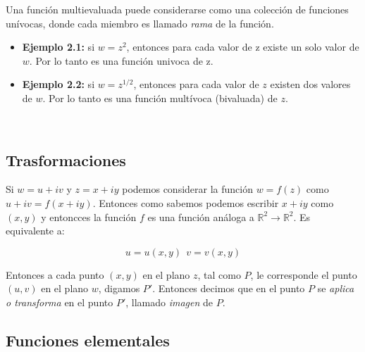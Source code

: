 \documentclass[12pt]{book}
\begin{document}
Una función multievaluada puede considerarse como una colección de funciones unívocas, donde cada miembro es llamado \textit{rama} de la función.  \\



\hrulefill
\begin{itemize}

\item \textbf{Ejemplo 2.1:} si $w = z^2$, entonces para cada valor de z existe un solo valor de $w$. Por lo tanto es una función univoca de z.

\item \textbf{Ejemplo 2.2:} si $w = z^{1/2}$, entonces para cada valor de $z$ existen dos valores de $w$. Por lo tanto es una función multívoca (bivaluada) de $z$. 

\end{itemize}
\hrulefill \\

\subsection{Trasformaciones}

Si $w = u +iv$ y $z = x+iy$ podemos considerar la función $w=f(z)$ como $u+iv = f(x+iy)$. Entonces como sabemos podemos escribir $x+iy $ como $(x,y)$ y entoncces la función $f$ es una función análoga a $\mathbb{R}^2 \rightarrow \mathbb{R}^2$. Es equivalente a:

\begin{equation}
u = u(x,y) \ \ v=v(x,y)
\end{equation}

Entonces a cada punto $(x,y)$ en el plano $z$, tal como $P$, le corresponde el punto $(u,v)$ en el plano $w$, digamos $P'$. Entonces decimos que en el punto $P$ se \textit{aplica o transforma} en el punto $P'$, llamado \textit{imagen} de $P$.

\subsection{Funciones elementales}
\end{document}
